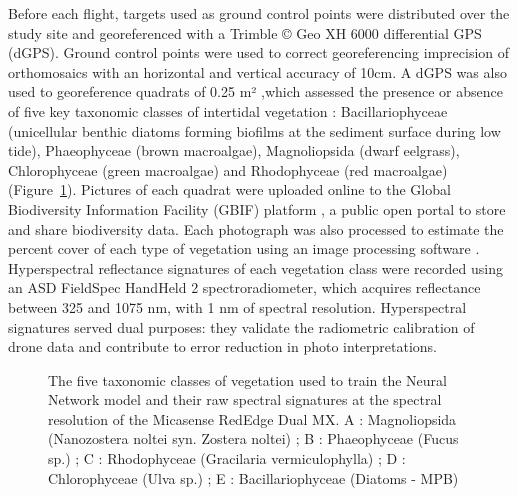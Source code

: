 \documentclass[
  number]{elsarticle}
\begin{document}
Before each flight, targets used as ground control points were
distributed over the study site and georeferenced with a Trimble © Geo
XH 6000 differential GPS (dGPS). Ground control points were used to
correct georeferencing imprecision of orthomosaics with an horizontal
and vertical accuracy of 10cm. A dGPS was also used to georeference
quadrats of 0.25 m² ,which assessed the presence or absence of five key
taxonomic classes of intertidal vegetation : Bacillariophyceae
(unicellular benthic diatoms forming biofilms at the sediment surface
during low tide), Phaeophyceae (brown macroalgae), Magnoliopsida (dwarf
eelgrass), Chlorophyceae (green macroalgae) and Rhodophyceae (red
macroalgae) (Figure~\ref{fig-vegetation}). Pictures of each quadrat were
uploaded online to the Global Biodiversity Information Facility (GBIF)
platform \citep{BedeGbif}, a public open portal to store and share
biodiversity data. Each photograph was also processed to estimate the
percent cover of each type of vegetation using an image processing
software \citep[ImageJ,][]{schneider2012nih}. Hyperspectral reflectance
signatures of each vegetation class were recorded using an ASD FieldSpec
HandHeld 2 spectroradiometer, which acquires reflectance between 325 and
1075 nm, with 1 nm of spectral resolution. Hyperspectral signatures
served dual purposes: they validate the radiometric calibration of drone
data and contribute to error reduction in photo interpretations.

\label{cell-fig-vegetation}
\begin{figure}[H]


\caption{\label{fig-vegetation}The five taxonomic classes of vegetation
used to train the Neural Network model and their raw spectral signatures
at the spectral resolution of the Micasense RedEdge Dual MX. A :
Magnoliopsida (Nanozostera noltei syn. Zostera noltei) ; B :
Phaeophyceae (Fucus sp.) ; C : Rhodophyceae (Gracilaria vermiculophylla)
; D : Chlorophyceae (Ulva sp.) ; E : Bacillariophyceae (Diatoms - MPB)}

\end{figure}%
\end{document}

